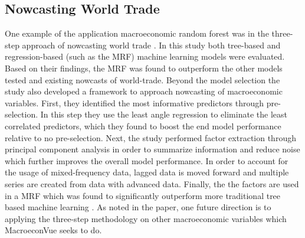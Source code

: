 \documentclass[conference]{IEEEtran}
\begin{document}
\subsection{Nowcasting World Trade}
One example of the application macroeconomic random forest was in the three-step approach of nowcasting world trade \cite{world_trade}. In this study both tree-based and regression-based (such as the MRF) machine learning models were evaluated. Based on their findings, the MRF was found to outperform the other models tested and existing nowcasts of world-trade. Beyond the model selection the study also developed a framework to approach nowcasting of macroeconomic variables. First, they identified the most informative predictors through pre-selection. In this step they use the least angle regression to eliminate the least correlated predictors, which they found to boost the end model performance relative to no pre-selection. Next, the study performed factor extraction through principal component analysis in order to summarize information and reduce noise which further improves the overall model performance. In order to account for the usage of mixed-frequency data, lagged data is moved forward and multiple series are created from data with advanced data. Finally, the the factors are used in a MRF which was found to significantly outperform more traditional tree based machine learning \cite{world_trade}. As noted in the paper, one future direction is to applying the three-step methodology on other macroeconomic variables which MacroeconVue seeks to do.
\end{document}
